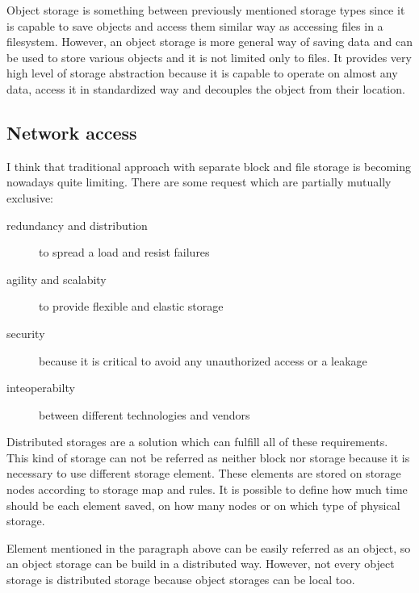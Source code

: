 Object storage is something between previously mentioned storage types since it is capable to save objects and access them similar way as accessing files in a filesystem. However, an object storage is more general way of saving data and can be used to store various objects and it is not limited only to files. It provides very high level of storage abstraction because it is capable to operate on almost any data, access it in standardized way and decouples the object from their location.
\label{par:object-storage}


\subsection{Network access}
I think that traditional approach with separate block and file storage is becoming nowadays quite limiting. There are some request which are partially mutually exclusive:
\begin{description}
	\item[redundancy and distribution] to spread a load and resist failures
	\item[agility and scalabity] to provide flexible and elastic storage
	\item[security] because it is critical to avoid any unauthorized access or a leakage
	\item[inteoperabilty] between different technologies and vendors
\end{description}

Distributed storages are a solution which can fulfill all of these requirements. This kind of storage can not be referred as neither block nor storage because it is necessary to use different storage element. These elements are stored on storage nodes according to storage map and rules. It is possible to define how much time should be each element saved, on how many nodes or on which type of physical storage.

Element mentioned in the paragraph above can be easily referred as an object, so an object storage can be build in a distributed way. However, not every object storage is distributed storage because object storages can be local too.

